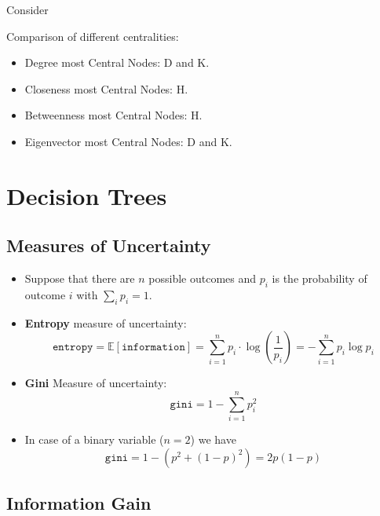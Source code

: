 
Consider


Comparison of different centralities:
\begin{itemize}
    \item Degree most Central Nodes: D and K.
    \item Closeness most Central Nodes: H.
    \item Betweenness most Central Nodes: H.
    \item Eigenvector most Central Nodes: D and K.
\end{itemize}

\section{Decision Trees}

\subsection{Measures of Uncertainty}

\begin{itemize}
    \item Suppose that there are $n$ possible outcomes and $p_{i}$ is the probability of outcome $i$ with $\sum _{i} p_{i} =1$.
    \item \textbf{Entropy} measure of uncertainty:
    \begin{equation*}
        \texttt{entropy} =\mathbb{E}\left[\texttt{information}\right] =\sum _{i=1}^{n} p_{i} \cdot \log\left(\frac{1}{p_{i}}\right) =-\sum _{i=1}^{n} p_{i}\log p_{i}
    \end{equation*}
    \item \textbf{Gini} Measure of uncertainty:
    \begin{equation*}
        \texttt{gini} = 1 - \sum_{i=1}^{n} p_{i}^{2}
    \end{equation*}
    \item In case of a binary variable ($n=2$) we have
    \begin{equation*}
        \texttt{gini} = 1 - (p^{2} + (1-p)^{2}) = 2p(1-p)
    \end{equation*}
\end{itemize}

\subsection{Information Gain}

